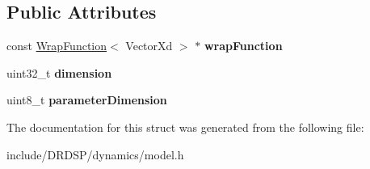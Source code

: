 \subsection*{Public Attributes}
\begin{DoxyCompactItemize}
\item 
\hypertarget{struct_d_r_d_s_p_1_1_model_parameterized_a65c8933121ff4801985cea23d00a3b1d}{const \hyperlink{struct_d_r_d_s_p_1_1_wrap_function}{Wrap\-Function}$<$ Vector\-Xd $>$ $\ast$ {\bfseries wrap\-Function}}\label{struct_d_r_d_s_p_1_1_model_parameterized_a65c8933121ff4801985cea23d00a3b1d}

\item 
\hypertarget{struct_d_r_d_s_p_1_1_model_parameterized_a80a78be5602accbde02f804ec1284be8}{uint32\-\_\-t {\bfseries dimension}}\label{struct_d_r_d_s_p_1_1_model_parameterized_a80a78be5602accbde02f804ec1284be8}

\item 
\hypertarget{struct_d_r_d_s_p_1_1_model_parameterized_a0ac0ef55c53f1b2361c32b9594ad081e}{uint8\-\_\-t {\bfseries parameter\-Dimension}}\label{struct_d_r_d_s_p_1_1_model_parameterized_a0ac0ef55c53f1b2361c32b9594ad081e}

\end{DoxyCompactItemize}


The documentation for this struct was generated from the following file\-:\begin{DoxyCompactItemize}
\item 
include/\-D\-R\-D\-S\-P/dynamics/model.\-h\end{DoxyCompactItemize}
